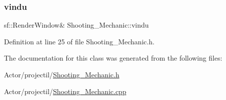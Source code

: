\hypertarget{class_shooting___mechanic_a74fc67d9d6a2840ca3f2500b964cc3e4}{}\label{class_shooting___mechanic_a74fc67d9d6a2840ca3f2500b964cc3e4} 
\subsubsection{\texorpdfstring{vindu}{vindu}}
{\footnotesize\ttfamily sf\+::\+Render\+Window\& Shooting\+\_\+\+Mechanic\+::vindu\hspace{0.3cm}{\ttfamily [protected]}}



Definition at line 25 of file Shooting\+\_\+\+Mechanic.\+h.



The documentation for this class was generated from the following files\+:\begin{DoxyCompactItemize}
\item 
Actor/projectil/\hyperlink{_shooting___mechanic_8h}{Shooting\+\_\+\+Mechanic.\+h}\item 
Actor/projectil/\hyperlink{_shooting___mechanic_8cpp}{Shooting\+\_\+\+Mechanic.\+cpp}\end{DoxyCompactItemize}
